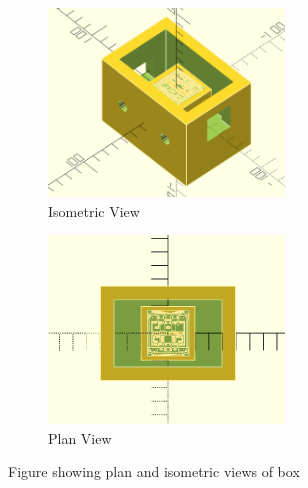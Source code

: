 \documentclass[a4paper,11pt]{report}
\begin{document}
 
\begin{figure}[h]

\begin{subfigure}{0.5\textwidth}
\includegraphics[width=0.9\linewidth, height=5cm]{Iso} 
\caption{Isometric View}
\label{fig:subim1}
\end{subfigure}
\begin{subfigure}{0.5\textwidth}
\includegraphics[width=0.9\linewidth, height=5cm]{Plan}
\caption{Plan View}
\label{fig:subim2}
\end{subfigure}

\caption{Figure showing plan and isometric views of box}
\label{fig:image2}
\end{figure}

 
 
 
\end{document}
